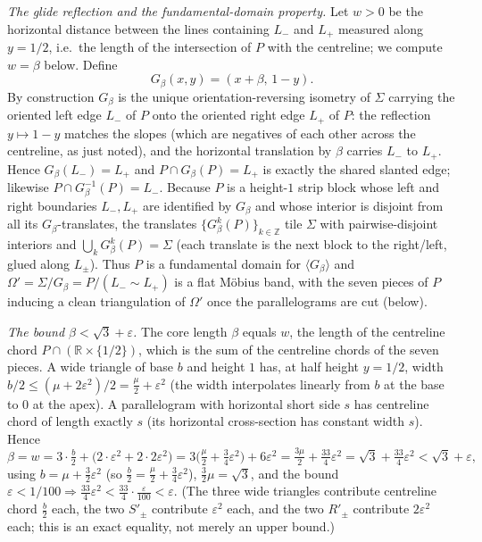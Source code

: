 \documentclass[12pt]{article}
\newcommand{\R}{\mathbb{R}}
\newcommand{\Z}{\mathbb{Z}}
\newcommand{\eps}{\varepsilon}
\newcommand{\Sig}{\Sigma}
\begin{document}
\smallskip
\emph{The glide reflection and the fundamental-domain property.}
Let $w>0$ be the horizontal distance between the lines containing $L_-$ and
$L_+$ measured along $y=1/2$, i.e.\ the length of the intersection of $P$
with the centreline; we compute $w=\beta$ below. Define
\[
G_\beta(x,y)=(x+\beta,\,1-y).
\]
By construction $G_\beta$ is the unique orientation-reversing isometry of
$\Sig$ carrying the oriented left edge $L_-$ of $P$ onto the oriented right
edge $L_+$ of $P$: the reflection $y\mapsto1-y$ matches the slopes (which
are negatives of each other across the centreline, as just noted), and the
horizontal translation by $\beta$ carries $L_-$ to $L_+$. Hence
$G_\beta(L_-)=L_+$ and $P\cap G_\beta(P)=L_+$ is exactly the shared
slanted edge; likewise $P\cap G_\beta^{-1}(P)=L_-$. Because $P$ is a
height-$1$ strip block whose left and right boundaries $L_-,L_+$ are
identified by $G_\beta$ and whose interior is disjoint from all its
$G_\beta$-translates, the translates $\{G_\beta^k(P)\}_{k\in\Z}$ tile
$\Sig$ with pairwise-disjoint interiors and $\bigcup_kG_\beta^k(P)=\Sig$
(each translate is the next block to the right/left, glued along $L_\pm$).
Thus $P$ is a fundamental domain for $\langle G_\beta\rangle$ and
$\Omega'=\Sig/G_\beta=P/(L_-\!\sim\!L_+)$ is a flat M\"obius band, with the
seven pieces of $P$ inducing a clean triangulation of $\Omega'$ once the
parallelograms are cut (below).

\smallskip
\emph{The bound $\beta<\sqrt3+\eps$.}
The core length $\beta$ equals $w$, the length of the centreline chord
$P\cap(\R\times\{1/2\})$, which is the sum of the centreline chords of the
seven pieces. A wide triangle of base $b$ and height $1$ has, at half
height $y=1/2$, width $b/2\le(\mu+2\eps^2)/2=\tfrac\mu2+\eps^2$ (the width
interpolates linearly from $b$ at the base to $0$ at the apex). A
parallelogram with horizontal short side $s$ has centreline chord of
length exactly $s$ (its horizontal cross-section has constant width $s$).
Hence
\begin{equation}\label{eq:beta}
\beta=w= 3\cdot\tfrac{b}{2}+\big(2\cdot\eps^2+2\cdot 2\eps^2\big)
=3\Big(\tfrac\mu2+\tfrac34\eps^2\Big)+6\eps^2
=\tfrac{3\mu}{2}+\tfrac{33}{4}\eps^2=\sqrt3+\tfrac{33}{4}\eps^2<\sqrt3+\eps,
\end{equation}
using $b=\mu+\tfrac32\eps^2$ (so $\tfrac{b}{2}=\tfrac\mu2+\tfrac34\eps^2$),
$\tfrac32\mu=\sqrt3$, and the bound $\eps<1/100\Rightarrow
\tfrac{33}{4}\eps^2<\tfrac{33}{4}\cdot\tfrac{\eps}{100}<\eps$.
(The three wide triangles contribute centreline chord $\tfrac{b}{2}$ each,
the two $S'_\pm$ contribute $\eps^2$ each, and the two $R'_\pm$ contribute
$2\eps^2$ each; this is an exact equality, not merely an upper bound.)
\end{document}
